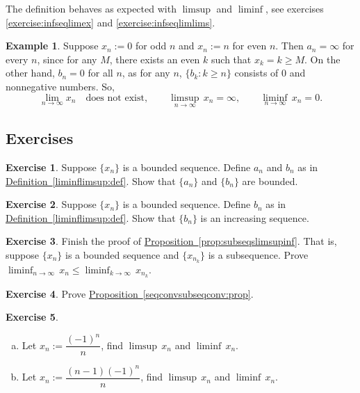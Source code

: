 \documentclass[12pt]{book}
\theoremstyle{plain}
\theoremstyle{remark}
\theoremstyle{definition}
\theoremstyle{exercise}
\newtheorem{exercise}{Exercise}[section]
\theoremstyle{example}
\newtheorem{example}[thm]{Example}
\newcommand{\propref}[1]{\hyperref[#1]{Proposition~\ref*{#1}}}
\newcommand{\defnref}[1]{\hyperref[#1]{Definition~\ref*{#1}}}
\begin{document}
The definition behaves as expected with
$\limsup$ and $\liminf$, see exercises \ref{exercise:infseqlimex}
and \ref{exercise:infseqlimlims}.

\begin{example}
Suppose 
$x_n := 0$ for odd $n$ and $x_n := n$ for even $n$.
Then $a_n = \infty$ for every $n$, since for any $M$,
there exists an even $k$ such that $x_k = k \geq M$.
On the other hand, $b_n = 0$ for all $n$, as
for any $n$,
$\{ b_k : k \geq n \}$ consists of $0$ and nonnegative numbers.
So,
\begin{equation*}
\lim_{n\to \infty} x_n \quad \text{does not exist},
\qquad 
\limsup_{n\to \infty} \, x_n = \infty ,
\qquad 
\liminf_{n\to \infty} \, x_n = 0.
\end{equation*}
\end{example}

\subsection{Exercises}

\begin{exercise}
Suppose $\{ x_n \}$ is a bounded sequence.  Define $a_n$ and
$b_n$ as in \defnref{liminflimsup:def}.  Show that $\{ a_n \}$
and $\{ b_n \}$ are bounded.
\end{exercise}

\begin{exercise}
Suppose $\{ x_n \}$ is a bounded sequence.
Define $b_n$ as in \defnref{liminflimsup:def}.  Show that
$\{ b_n \}$ is an increasing sequence.
\end{exercise}

\begin{exercise}
Finish the proof of \propref{prop:subseqslimsupinf}.  That is,
suppose $\{ x_n \}$ is a bounded sequence and
$\{ x_{n_k} \}$ is a subsequence.  Prove
$\displaystyle \liminf_{n\to\infty}\, x_n \leq
\liminf_{k\to\infty}\, x_{n_k}$.
\end{exercise}

\begin{exercise}
Prove \propref{seqconvsubseqconv:prop}.
\end{exercise}

\begin{exercise}
\begin{enumerate}[a)]
\item
Let $x_n := \dfrac{{(-1)}^n}{n}$, find $\limsup \, x_n$ and $\liminf \, x_n$.
\item
Let $x_n := \dfrac{(n-1){(-1)}^n}{n}$, find $\limsup \, x_n$ and $\liminf \, x_n$.
\end{enumerate}
\end{exercise}
\end{document}
